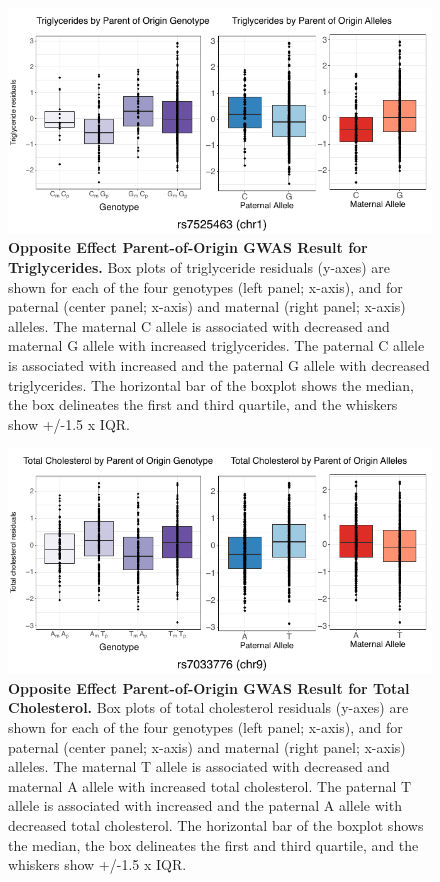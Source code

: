 \begin{figure}[!htb]
\centering
\includegraphics[width=5in]{img/ch02/fig-s10.pdf}
\caption[Opposite Effect Parent-of-Origin GWAS Result for Triglycerides.]{\textbf{Opposite Effect Parent-of-Origin GWAS Result for Triglycerides.}  Box plots of triglyceride residuals (y-axes) are shown for each of the four genotypes (left panel; x-axis), and for paternal (center panel; x-axis) and maternal (right panel; x-axis) alleles. The maternal C allele is associated with decreased and maternal G allele with increased triglycerides. The paternal C allele is associated with increased and the paternal G allele with decreased triglycerides. The horizontal bar of the boxplot shows the median, the box delineates the first and third quartile, and the whiskers show +/-1.5 x IQR.}
\label{fig:fig-s10}
\end{figure}

\begin{figure}[!htb]
\centering
\includegraphics[width=5in]{img/ch02/fig-s11.pdf}
\caption[Opposite Effect Parent-of-Origin GWAS Result for Total Cholesterol.]{\textbf{Opposite Effect Parent-of-Origin GWAS Result for Total Cholesterol.}  Box plots of total cholesterol residuals (y-axes) are shown for each of the four genotypes (left panel; x-axis), and for paternal (center panel; x-axis) and maternal (right panel; x-axis) alleles. The maternal T allele is associated with decreased and maternal A allele with increased total cholesterol. The paternal T allele is associated with increased and the paternal A allele with decreased total cholesterol. The horizontal bar of the boxplot shows the median, the box delineates the first and third quartile, and the whiskers show +/-1.5 x IQR.}
\label{fig:fig-s11}
\end{figure}

